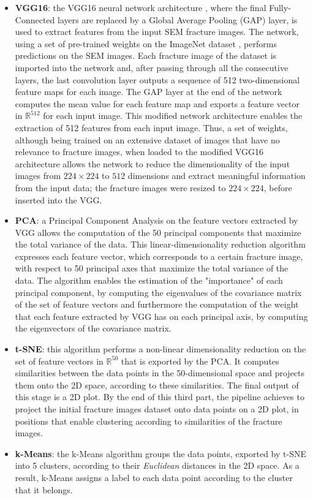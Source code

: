 \documentclass[authoryear,preprint,review,12pt, singleside]{elsarticle}
\begin{document}
\begin{itemize}
	\item \textbf{VGG16}: the VGG16 neural network architecture \citep{vgg}, where the final Fully-Connected layers are replaced by a Global Average Pooling (GAP) layer, is used to extract features from the input SEM fracture images. The network, using a set of pre-trained weights on the ImageNet dataset \citep{imagenet}, performs predictions on the SEM images. Each fracture image of the dataset is imported into the network and, after passing through all the consecutive layers, the last convolution layer outputs a sequence of 512 two-dimensional feature maps for each image. The GAP layer at the end of the network computes the mean value for each feature map and exports a feature vector in $\mathbb{R}^{512}$ for each input image. This modified network architecture enables the extraction of 512 features from each input image. Thus, a set of weights, although being trained on an extensive dataset of images that have no relevance to fracture images, when loaded to the modified VGG16 architecture allows the network to reduce the dimensionality of the input images from $224 \times 224$  to $512$ dimensions and extract meaningful information from the input data; the fracture images were resized to $224 \times 224$, before inserted into the VGG. 
	\item \textbf{PCA}: a Principal Component Analysis \citep{pca} on the feature vectors extracted by VGG allows the computation of the 50 principal components that maximize the total variance of the data. This linear-dimensionality reduction algorithm expresses each feature vector, which corresponds to a certain fracture image, with respect to 50 principal axes that maximize the total variance of the data. The algorithm enables the estimation of the "importance" of each principal component, by computing the eigenvalues of the covariance matrix of the set of feature vectors and furthermore the computation of the weight that each feature extracted by VGG has on each principal axis, by computing the eigenvectors of the covariance matrix. 
	\item \textbf{t-SNE}: this  algorithm \citep{tsne} performs a non-linear dimensionality reduction on the set of feature vectors in $\mathbb{R}^{50}$ that is exported by the PCA. It computes similarities between the data points in the 50-dimensional space and projects them onto the 2D space, according to these similarities. The final output of this stage is a 2D plot. By the end of this third part, the pipeline achieves to project the initial fracture images dataset onto data points on a 2D plot, in positions that enable clustering according to similarities of the fracture images.
	\item \textbf{k-Means}: the k-Means algorithm \citep{kmeans} groups the data points, exported by t-SNE into 5 clusters, according to their \textit{Euclidean} distances in the 2D space. As a result, k-Means assigns a label to each data point according to the cluster that it belongs.    
\end{itemize} 
\end{document}
